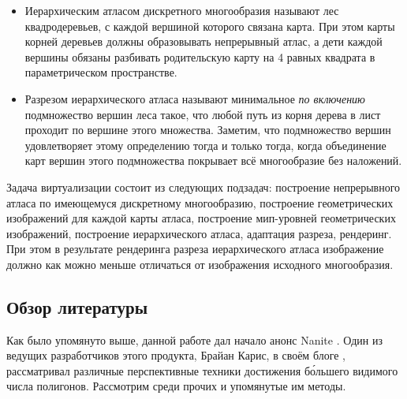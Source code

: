 \documentclass[12pt]{extarticle}
\begin{document}
\begin{itemize}
\item Иерархическим атласом \cite{niski2007multi} дискретного многообразия называют лес квадродеревьев, с каждой вершиной которого связана карта. При этом карты корней деревьев должны образовывать непрерывный атлас, а дети каждой вершины обязаны разбивать родительскую карту на 4 равных квадрата в параметрическом пространстве.
\item Разрезом иерархического атласа называют минимальное \emph{по включению} подмножество вершин леса такое, что любой путь из корня дерева в лист проходит по вершине этого множества. Заметим, что подмножество вершин удовлетворяет этому определению тогда и только тогда, когда объединение карт вершин этого подмножества покрывает всё многообразие без наложений.
\end{itemize}

Задача виртуализации состоит из следующих подзадач: построение непрерывного атласа по имеющемуся дискретному многообразию, построение геометрических изображений для каждой карты атласа, построение мип-уровней геометрических изображений, построение иерархического атласа, адаптация разреза, рендеринг. При этом в результате рендеринга разреза иерархического атласа изображение должно как можно меньше отличаться от изображения исходного многообразия.

\subsection{Обзор литературы}
\label{sec:related}
Как было упомянуто выше, данной работе дал начало анонс Nanite \cite{nanite}. Один из ведущих разработчиков этого продукта, Брайан Карис, в своём блоге \cite{graphicrants_moregeometry}, \cite{graphicrants_vgi} рассматривал различные перспективные техники достижения б\'ольшего видимого числа полигонов. Рассмотрим среди прочих и упомянутые им методы.
\end{document}
